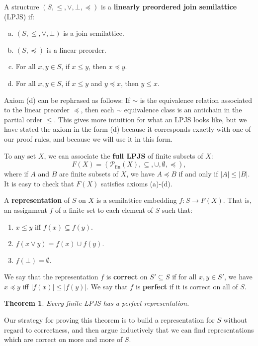 \documentclass[12pt]{article}
\newtheorem{theorem}{Theorem}
\begin{document}
A structure $(S,\leq, \vee, \bot, \preceq)$ is a \textbf{linearly preordered join semilattice} (LPJS) if: 
\begin{enumerate}[(a)]
    \item $(S,\leq,\vee,\bot)$ is a join semilattice. 
    \item $(S,\preceq)$ is a linear preorder.
    \item For all $x,y\in S$, if $x\leq y$, then $x\preceq y$.
    \item For all $x,y\in S$, if $x\leq y$ and $y\preceq x$, then $y\leq x$. 
\end{enumerate}

Axiom (d) can be rephrased as follows: If $\sim$ is the equivalence relation associated to the linear preorder $\preceq$, then each $\sim$ equivalence class is an antichain in the partial order $\leq$. This gives more intuition for what an LPJS looks like, but we have stated the axiom in the form (d) because it corresponds exactly with one of our proof rules, and because we will use it in this form. 

To any set $X$, we can associate the \textbf{full LPJS} of finite subsets of $X$: $$F(X) = (\mathcal{P}_\text{fin}(X), \subseteq, \cup, \emptyset, \preceq),$$ where if $A$ and $B$ are finite subsets of $X$, we have $A\preceq B$ if and only if $|A|\leq |B|$. It is easy to check that $F(X)$ satisfies axioms (a)-(d).

A \textbf{representation} of $S$ on $X$ is a semilattice embedding $f\colon S\to F(X)$. That is, an assignment $f$ of a finite set to each element of $S$ such that:
\begin{enumerate}[(1)]
    \item $x\leq y$ iff $f(x)\subseteq f(y)$.
    \item $f(x\vee y) = f(x)\cup f(y)$.
    \item $f(\bot) = \emptyset$.
\end{enumerate} 
We say that the representation $f$ is \textbf{correct} on $S'\subseteq S$ if for all $x,y\in S'$, we have $x\preceq y$ iff $|f(x)|\leq |f(y)|$. We say that $f$ is \textbf{perfect} if it is correct on all of $S$. 

\begin{theorem}\label{thm:rep}
Every finite LPJS has a perfect representation.
\end{theorem}

Our strategy for proving this theorem is to build a representation for $S$ without regard to correctness, and then argue inductively that we can find representations which are correct on more and more of $S$.
\end{document}
